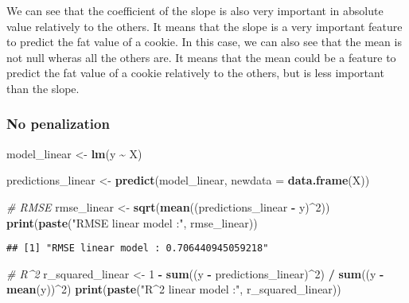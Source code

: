 \documentclass[
]{article}
\newenvironment{Shaded}{\begin{snugshade}}{\end{snugshade}}
\newcommand{\AttributeTok}[1]{\textcolor[rgb]{0.13,0.29,0.53}{#1}}
\newcommand{\CommentTok}[1]{\textcolor[rgb]{0.56,0.35,0.01}{\textit{#1}}}
\newcommand{\DecValTok}[1]{\textcolor[rgb]{0.00,0.00,0.81}{#1}}
\newcommand{\FunctionTok}[1]{\textcolor[rgb]{0.13,0.29,0.53}{\textbf{#1}}}
\newcommand{\NormalTok}[1]{#1}
\newcommand{\OtherTok}[1]{\textcolor[rgb]{0.56,0.35,0.01}{#1}}
\newcommand{\SpecialCharTok}[1]{\textcolor[rgb]{0.81,0.36,0.00}{\textbf{#1}}}
\newcommand{\StringTok}[1]{\textcolor[rgb]{0.31,0.60,0.02}{#1}}
\begin{document}
We can see that the coefficient of the slope is also very important in
absolute value relatively to the others. It means that the slope is a
very important feature to predict the fat value of a cookie. In this
case, we can also see that the mean is not null wheras all the others
are. It means that the mean could be a feature to predict the fat value
of a cookie relatively to the others, but is less important than the
slope.

\subsubsection{No penalization}\label{no-penalization}

\begin{Shaded}
\begin{Highlighting}[]
\NormalTok{model\_linear }\OtherTok{\textless{}{-}} \FunctionTok{lm}\NormalTok{(y }\SpecialCharTok{\textasciitilde{}}\NormalTok{ X)}

\NormalTok{predictions\_linear }\OtherTok{\textless{}{-}} \FunctionTok{predict}\NormalTok{(model\_linear, }\AttributeTok{newdata =} \FunctionTok{data.frame}\NormalTok{(X))}

\CommentTok{\# RMSE}
\NormalTok{rmse\_linear }\OtherTok{\textless{}{-}} \FunctionTok{sqrt}\NormalTok{(}\FunctionTok{mean}\NormalTok{((predictions\_linear }\SpecialCharTok{{-}}\NormalTok{ y)}\SpecialCharTok{\^{}}\DecValTok{2}\NormalTok{)) }
\FunctionTok{print}\NormalTok{(}\FunctionTok{paste}\NormalTok{(}\StringTok{"RMSE linear model :"}\NormalTok{, rmse\_linear))}
\end{Highlighting}
\end{Shaded}

\begin{verbatim}
## [1] "RMSE linear model : 0.706440945059218"
\end{verbatim}

\begin{Shaded}
\begin{Highlighting}[]
\CommentTok{\# R\^{}2}
\NormalTok{r\_squared\_linear }\OtherTok{\textless{}{-}} \DecValTok{1} \SpecialCharTok{{-}} \FunctionTok{sum}\NormalTok{((y }\SpecialCharTok{{-}}\NormalTok{ predictions\_linear)}\SpecialCharTok{\^{}}\DecValTok{2}\NormalTok{) }\SpecialCharTok{/} \FunctionTok{sum}\NormalTok{((y }\SpecialCharTok{{-}} \FunctionTok{mean}\NormalTok{(y))}\SpecialCharTok{\^{}}\DecValTok{2}\NormalTok{)}
\FunctionTok{print}\NormalTok{(}\FunctionTok{paste}\NormalTok{(}\StringTok{"R\^{}2 linear model :"}\NormalTok{, r\_squared\_linear))}
\end{Highlighting}
\end{Shaded}
\end{document}
